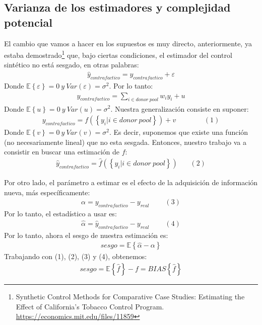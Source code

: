 \documentclass[12pt]{article}
\begin{document}
\subsection{Varianza de los estimadores y complejidad potencial}

El cambio que vamos a hacer en los supuestos es muy directo, anteriormente, ya estaba demostrado\footnote{Synthetic Control Methods for Comparative Case Studies: Estimating the Effect of California’s Tobacco Control Program. \url{https://economics.mit.edu/files/11859}} que, bajo ciertas condiciones, el estimador del control sintético no está sesgado, en otras palabras:
\begin{align*}
    {\hat{y}}_{contrafactico}=y_{contrafactico}+\varepsilon
\end{align*}
Donde {$ \mathbb{E}\left\{\varepsilon\right\}=0 \ y \ Var\left(\varepsilon\right)=\sigma^2. $}
Por lo tanto:
\begin{align*}
    y_{contrafactico}=\sum_{i\in d o n o r\ pool}{w_iy_i}+u
\end{align*}
Donde {$ \mathbb{E}\left\{u\right\}=0 \ y \ Var\left(u\right)=\sigma^2. $}
Nuestra generalización consiste en suponer: 
\begin{align*}
    y_{contrafactico}=f\left(\left\{y_i|i\in d o n o r\ pool\right\}\right)+v\ \ \ \ \ \ \ \ \ \ \ \ \ \ \ \ \ \ (1)
\end{align*}
Donde {$ \mathbb{E}\left\{v\right\}=0 \ y \ Var\left(v\right)=\sigma^2. $}
Es decir, suponemos que existe una función (no necesariamente lineal) que no esta sesgada.
Entonces, nuestro trabajo va a consistir en buscar una estimación de {$f$}:
\begin{align*}
    {\hat{y}}_{contrafactico}=\hat{f}\left(\left\{y_i|i\in d o n o r\ pool\right\}\right)\ \ \ \ \ \ \ \ (2) 
\end{align*}

Por otro lado, el parámetro a estimar es el efecto de la adquisición de información nueva, más específicamente:
\begin{align*}
    \alpha=y_{contrafactico}-y_{real}\ \ \ \ \ \ \ \ \ \ (3)
\end{align*}
Por lo tanto, el estadístico a usar es: 
\begin{align*}
    \hat{\alpha}={\hat{y}}_{contrafactico}-y_{real}\ \ \ \ \ \ \ \ \ \ (4)
\end{align*}
Por lo tanto, ahora el sesgo de nuestra estimación es:
\begin{align*}
sesgo=\mathbb{E}\left\{\hat{\alpha}-\alpha\right\}
\end{align*}
Trabajando con (1), (2), (3) y (4), obtenemos:
\begin{align*}
sesgo=\mathbb{E}\left\{\hat{f}\right\}-f
=BIAS\left\{\hat{f}\right\}
\end{align*}
\end{document}
